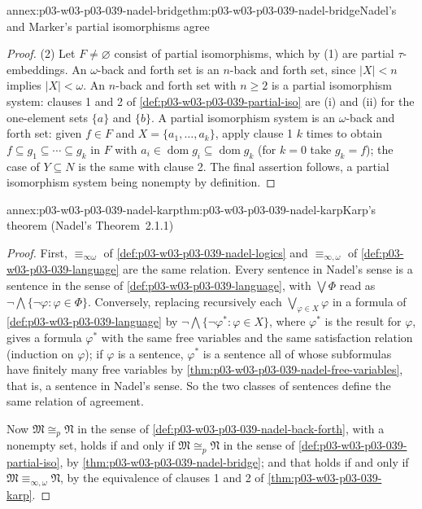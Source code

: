 \begin{annexitem}{annex:p03-w03-p03-039-nadel-bridge}{thm:p03-w03-p03-039-nadel-bridge}{Nadel's and Marker's partial isomorphisms agree}
\begin{proof}
(2) Let \(F\ne\varnothing\) consist of partial isomorphisms, which by (1) are
partial \(\tau\)-embeddings. An \(\omega\)-back and forth set is an
\(n\)-back and forth set, since \(\lvert X\rvert<n\) implies
\(\lvert X\rvert<\omega\). An \(n\)-back and forth set with \(n\ge2\) is a
partial isomorphism system: clauses 1 and 2 of
\cref{def:p03-w03-p03-039-partial-iso} are (i) and (ii) for the one-element
sets \(\{a\}\) and \(\{b\}\). A partial isomorphism system is an
\(\omega\)-back and forth set: given \(f\in F\) and \(X=\{a_1,\dots,a_k\}\),
apply clause 1 \(k\) times to obtain \(f\subseteq g_1\subseteq\cdots\subseteq g_k\)
in \(F\) with \(a_i\in\operatorname{dom}g_i\subseteq\operatorname{dom}g_k\)
(for \(k=0\) take \(g_k=f\)); the case of \(Y\subseteq N\) is the same with
clause 2. The final assertion follows, a partial isomorphism system being
nonempty by definition.
\end{proof}
\end{annexitem}

\begin{annexitem}{annex:p03-w03-p03-039-nadel-karp}{thm:p03-w03-p03-039-nadel-karp}{Karp's theorem (Nadel's Theorem~2.1.1)}
\begin{proof}
First, \(\equiv_{\infty\omega}\) of \cref{def:p03-w03-p03-039-nadel-logics}
and \(\equiv_{\infty,\omega}\) of \cref{def:p03-w03-p03-039-language} are the
same relation. Every sentence in Nadel's sense is a sentence in the sense of
\cref{def:p03-w03-p03-039-language}, with \(\bigvee\Phi\) read as
\(\neg\bigwedge\{\neg\varphi:\varphi\in\Phi\}\). Conversely, replacing
recursively each \(\bigvee_{\varphi\in X}\varphi\) in a formula of
\cref{def:p03-w03-p03-039-language} by
\(\neg\bigwedge\{\neg\varphi^*:\varphi\in X\}\), where \(\varphi^*\) is the
result for \(\varphi\), gives a formula \(\varphi^*\) with the same free
variables and the same satisfaction relation (induction on \(\varphi\)); if
\(\varphi\) is a sentence, \(\varphi^*\) is a sentence all of whose subformulas
have finitely many free variables by
\cref{thm:p03-w03-p03-039-nadel-free-variables}, that is, a sentence in
Nadel's sense. So the two classes of sentences define the same relation of
agreement.

Now \(\mathfrak M\cong_p\mathfrak N\) in the sense of
\cref{def:p03-w03-p03-039-nadel-back-forth}, with a nonempty set, holds if
and only if \(\mathfrak M\cong_p\mathfrak N\) in the sense of
\cref{def:p03-w03-p03-039-partial-iso}, by
\cref{thm:p03-w03-p03-039-nadel-bridge}; and that holds if and only if
\(\mathfrak M\equiv_{\infty,\omega}\mathfrak N\), by the equivalence of
clauses 1 and 2 of \cref{thm:p03-w03-p03-039-karp}.
\end{proof}
\end{annexitem}

